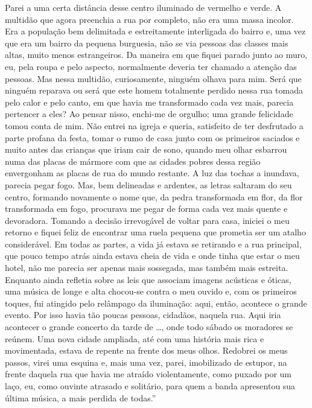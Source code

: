 Parei a uma certa distância desse centro iluminado de vermelho e verde.
A multidão que agora preenchia a rua por completo, não era uma massa
incolor. Era a população bem delimitada e estreitamente interligada do
bairro e, uma vez que era um bairro da pequena burguesia, não se via
pessoas das classes mais altas, muito menos estrangeiros. Da maneira em
que fiquei parado junto ao muro, eu, pela roupa e pelo aspecto,
normalmente deveria ter chamado a atenção das pessoas. Mas nessa
multidão, curiosamente, ninguém olhava para mim. Será que ninguém
reparava ou será que este homem totalmente perdido nessa rua tomada pelo
calor e pelo canto, em que havia me transformado cada vez mais, parecia
pertencer a eles? Ao pensar nisso, enchi-me de orgulho; uma grande
felicidade tomou conta de mim. Não entrei na igreja e queria, satisfeito
de ter desfrutado a parte profana da festa, tomar o rumo de casa junto
com os primeiros saciados e muito antes das crianças que iriam cair de
sono, quando meu olhar esbarrou numa das placas de mármore com que as
cidades pobres dessa região envergonham as placas de rua do mundo
restante. A luz das tochas a inundava, parecia pegar fogo. Mas, bem
delineadas e ardentes, as letras saltaram do seu centro, formando
novamente o nome que, da pedra transformada em flor, da flor
transformada em fogo, procurava me pegar de forma cada vez mais quente e
devoradora. Tomando a decisão irrevogável de voltar para casa, iniciei o
meu retorno e fiquei feliz de encontrar uma ruela pequena que prometia
ser um atalho considerável. Em todas as partes, a vida já estava se
retirando e a rua principal, que pouco tempo atrás ainda estava cheia de
vida e onde tinha que estar o meu hotel, não me parecia ser apenas mais
sossegada, mas também mais estreita. Enquanto ainda refletia sobre as
leis que associam imagens acústicas e óticas, uma música de longe e alta
chocou-se contra o meu ouvido e, com os primeiros toques, fui atingido
pelo relâmpago da iluminação: aqui, então, acontece o grande evento. Por
isso havia tão poucas pessoas, cidadãos, naquela rua. Aqui iria
acontecer o grande concerto da tarde de \ldots{}, onde todo sábado os
moradores se reúnem. Uma nova cidade ampliada, até com uma história mais
rica e movimentada, estava de repente na frente dos meus olhos. Redobrei
os meus passos, virei uma esquina e, mais uma vez, parei, imobilizado de
estupor, na frente daquela rua que havia me atraído violentamente, como
puxado por um laço, eu, como ouvinte atrasado e solitário, para quem a
banda apresentou sua última música, a mais perdida de todas.''

